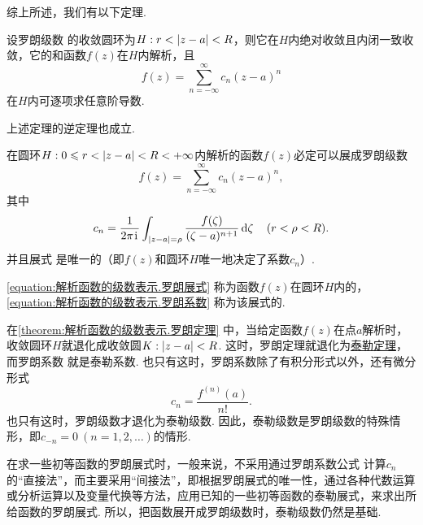 综上所述，我们有以下定理.
\begin{theorem}
设罗朗级数 的收敛圆环为\(H: r < \abs{z-a} < R\)，则它在\(H\)内绝对收敛且内闭一致收敛，它的和函数\(f(z)\)在\(H\)内解析，且\[
f(z) = \sum\limits_{n=-\infty}^{\infty} c_n (z-a)^n
\]在\(H\)内可逐项求任意阶导数.
\end{theorem}

上述定理的逆定理也成立.
\begin{theorem}[罗朗定理]\label{theorem:解析函数的级数表示.罗朗定理}
在圆环\(H: 0 \leqslant r < \abs{z-a} < R < +\infty\)内解析的函数\(f(z)\)必定可以展成罗朗级数\begin{equation}\label{equation:解析函数的级数表示.罗朗展式}
f(z) = \sum\limits_{n=-\infty}^{\infty} c_n (z-a)^n,
\end{equation}其中\begin{equation}\label{equation:解析函数的级数表示.罗朗系数}
c_n = \frac{1}{2\pi\kern1pt\mathrm{i}\kern1pt} \int_{\abs{z-a}=\rho} \frac{f(\zeta)}{(\zeta-a)^{n+1}} \dd{\zeta}
\quad(r<\rho<R).
\end{equation}
并且展式 是唯一的（即\(f(z)\)和圆环\(H\)唯一地决定了系数\(c_n\)）.
\end{theorem}
\cref{equation:解析函数的级数表示.罗朗展式} 称为函数\(f(z)\)在圆环\(H\)内的，\cref{equation:解析函数的级数表示.罗朗系数} 称为该展式的.

在\cref{theorem:解析函数的级数表示.罗朗定理} 中，当给定函数\(f(z)\)在点\(a\)解析时，收敛圆环\(H\)就退化成收敛圆\(K: \abs{z-a}<R\).
这时，罗朗定理就退化为\hyperref[theorem:解析函数的级数表示.泰勒定理]{泰勒定理}，而罗朗系数 就是泰勒系数.
也只有这时，罗朗系数除了有积分形式以外，还有微分形式\[
c_n = \frac{f^{(n)}(a)}{n!}.
\]也只有这时，罗朗级数才退化为泰勒级数.
因此，泰勒级数是罗朗级数的特殊情形，即\(c_{-n} = 0\ (n=1,2,\dotsc)\)的情形.

在求一些初等函数的罗朗展式时，一般来说，不采用通过罗朗系数公式 计算\(c_n\)的“直接法”，而主要采用“间接法”，即根据罗朗展式的唯一性，通过各种代数运算或分析运算以及变量代换等方法，应用已知的一些初等函数的泰勒展式，来求出所给函数的罗朗展式.
所以，把函数展开成罗朗级数时，泰勒级数仍然是基础.

